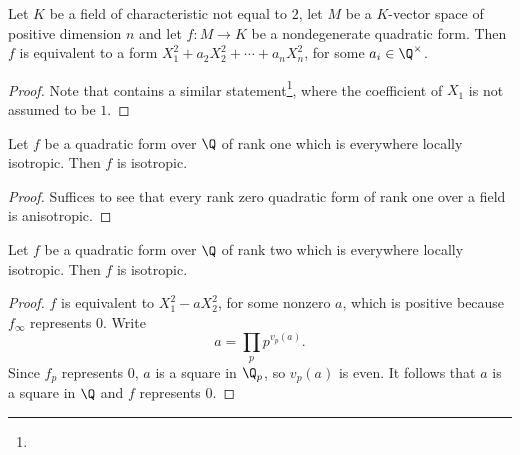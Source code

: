 \begin{lemma}\label{lem:equiv_sum_squares}
\leanok
Let $K$ be a field of characteristic not equal to $2$, let $M$ be a $K$-vector space of positive dimension $n$ and let $f : M \to K$ be a
nondegenerate quadratic form. Then $f$ is equivalent to a form $X_1^2 +  a_2X_2^2 + \cdots + a_nX_n^2$, for some $a_i \in \Q^\times$.
\end{lemma}
\begin{proof}
Note that \mathlib contains a similar statement\footnote{}, where the coefficient of $X_1$ is not assumed to be $1$.
\end{proof}

\begin{lemma}\label{lem:isotr_of_rk_one}
	\leanok
	Let $f$ be a quadratic form over $\Q$ of rank one which is everywhere locally isotropic. Then $f$ is isotropic.
\end{lemma}
\begin{proof}
Suffices to see that every rank zero quadratic form of rank one over a field is anisotropic.
\end{proof}

\begin{lemma}\label{lem:isotr_of_rk_two}
	\leanok
	Let $f$ be a quadratic form over $\Q$ of rank two which is everywhere locally isotropic. Then $f$ is isotropic.
\end{lemma}
\begin{proof}
$f$ is equivalent to $X_1^2 - aX_2^2$, for some nonzero $a$, which is positive because $f_\infty$ represents $0$. Write
\[ a = \prod_p p^{v_p(a)}.\]
Since $f_p$ represents $0$, $a$ is a square in $\Q_p$, so $v_p(a)$ is even. It follows that $a$ is a square in $\Q$ and $f$ represents $0$.
\end{proof}

